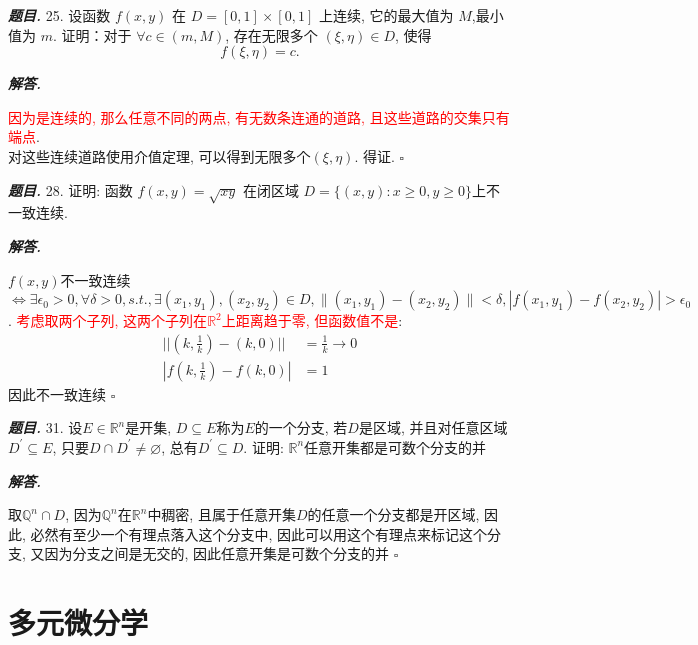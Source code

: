 \documentclass[10pt, a4paper, oneside]{ctexart}
\newcommand{\norm}[1]{\| #1 \|}
\newenvironment{problem}{\begin{framed}\par\noindent\textbf{\textit{题目. }}}{\end{framed}\par}
\newenvironment{solution}{%
  \par\noindent\textbf{\textit{解答. }}\ignorespaces
}{%
  \hfill\ensuremath{\square}\par %
}
\begin{document}
\begin{problem}
    25. 设函数 $f(x, y)$ 在 $D=[0,1] \times[0,1]$ 上连续, 它的最大值为 $M$,最小值为 $m$. 证明：对于 $\forall c \in(m, M)$, 存在无限多个 $(\xi, \eta) \in D$, 使得
    $$
    f(\xi, \eta)=c .
    $$
\end{problem}
\begin{solution}
\textcolor{red}{因为是连续的, 那么任意不同的两点, 有无数条连通的道路, 且这些道路的交集只有端点}.\\
对这些连续道路使用介值定理, 可以得到无限多个$(\xi,\eta)$. 得证.
\end{solution}

\begin{problem}
    28. 证明: 函数 $f(x, y)=\sqrt{x y}$ 在闭区域 $D=\{(x, y): x \geqslant 0, y \geqslant 0\}$上不一致连续.
\end{problem}
\begin{solution}
$f(x,y)$不一致连续$\iff \exists \epsilon_0>0, \forall \delta>0,s.t., \exists (x_1,y_1),(x_2,y_2)\in D, \norm{(x_1,y_1)-(x_2,y_2)}<\delta, |f(x_1,y_1)-f(x_2,y_2)|>\epsilon_0$.
\textcolor{red}{考虑取两个子列, 这两个子列在$\mathbb{R}^2$上距离趋于零, 但函数值不是}:
\begin{align*}
    ||(k,\frac{1}{k} )-(k,0)||&=\frac{1}{k}\to 0\\
    | f(k,\frac{1}{k})-f(k,0) |&=1
\end{align*}
因此不一致连续
\end{solution}

\begin{problem}
31. 设$E\in \mathbb{R}^n$是开集, $D\subseteq E$称为$E$的一个分支, 若$D$是区域, 并且对任意区域$D^{\prime}\subseteq E$, 只要$D\cap D^{\prime}\neq \varnothing$, 总有$D^{\prime}\subseteq D$. 证明: $\mathbb{R}^n$任意开集都是可数个分支的并
\end{problem}
\begin{solution}
取$\mathbb{Q}^n\cap D$, 因为$\mathbb{Q}^n$在$\mathbb{R}^n$中稠密, 且属于任意开集$D$的任意一个分支都是开区域, 因此, 必然有至少一个有理点落入这个分支中, 因此可以用这个有理点来标记这个分支, 又因为分支之间是无交的, 因此任意开集是可数个分支的并
\end{solution}

\section{多元微分学}
\end{document}
